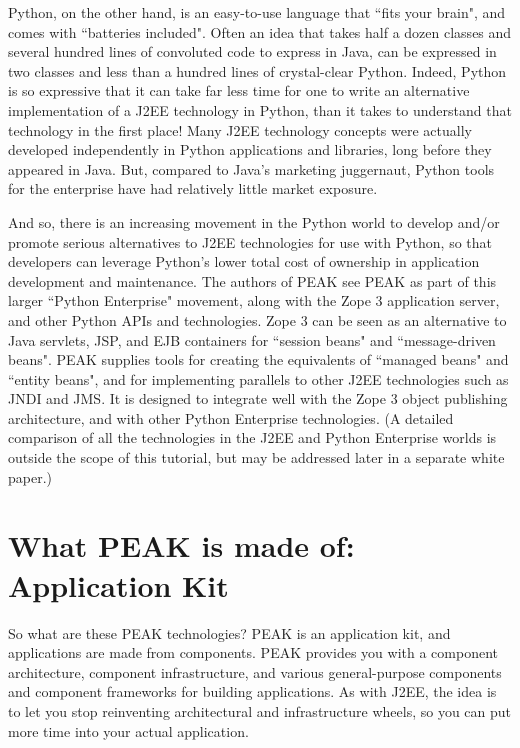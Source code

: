 Python, on the other hand, is an easy-to-use language that ``fits your
brain", and comes with ``batteries included".  Often an idea that takes
half a dozen classes and several hundred lines of convoluted code to
express in Java, can be expressed in two classes and less than a hundred
lines of crystal-clear Python.  Indeed, Python is so expressive that it
can take far less time for one to write an alternative implementation of
a J2EE technology in Python, than it takes to understand that technology
in the first place!  Many J2EE technology concepts were actually
developed independently in Python applications and libraries, long
before they appeared in Java.  But, compared to Java's marketing
juggernaut, Python tools for the enterprise have had relatively little
market exposure. 

And so, there is an increasing movement in the Python world to develop
and/or promote serious alternatives to J2EE technologies for use with
Python, so that developers can leverage Python's lower total cost of
ownership in application development and maintenance. The authors of
PEAK see PEAK as part of this larger ``Python Enterprise" movement, along
with the Zope 3 application server, and other Python APIs and
technologies. Zope 3 can be seen as an alternative to Java servlets,
JSP, and EJB containers for ``session beans" and ``message-driven beans".
PEAK supplies tools for creating the equivalents of ``managed beans" and
``entity beans", and for implementing parallels to other J2EE technologies
such as JNDI and JMS.  It is designed to integrate well with the Zope 3 
object publishing architecture, and with other Python Enterprise
technologies. (A detailed comparison of all the technologies in the J2EE
and Python Enterprise worlds is outside the scope of this tutorial, but
may be addressed later in a separate white paper.) 


\section{What PEAK is made of: Application Kit} 

So what are these PEAK technologies? PEAK is an application kit, and
applications are made from components.  PEAK provides you with a
component architecture, component infrastructure, and various
general-purpose components and component frameworks for building
applications. As with J2EE, the idea is to let you stop reinventing
architectural and infrastructure wheels, so you can put more time into
your actual application. 

